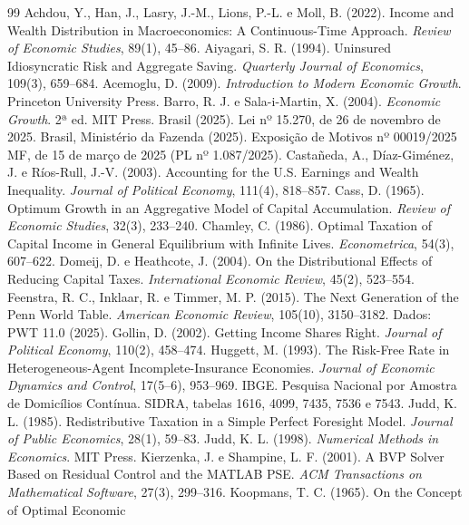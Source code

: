 \documentclass[11pt,a4paper]{article}
\begin{document}
\begin{thebibliography}{99}
\small
{} Achdou, Y., Han, J., Lasry, J.-M., Lions, P.-L. e Moll, B. (2022).
Income and Wealth Distribution in Macroeconomics: A Continuous-Time Approach.
\emph{Review of Economic Studies}, 89(1), 45--86.
 Aiyagari, S. R. (1994). Uninsured Idiosyncratic Risk and
Aggregate Saving. \emph{Quarterly Journal of Economics}, 109(3), 659--684.
 Acemoglu, D. (2009). \emph{Introduction to Modern Economic
Growth}. Princeton University Press.
 Barro, R. J. e Sala-i-Martin, X. (2004). \emph{Economic Growth}.
2ª ed. MIT Press.
 Brasil (2025). Lei nº 15.270, de 26 de novembro de 2025.
 Brasil, Ministério da Fazenda (2025). Exposição de Motivos
nº 00019/2025 MF, de 15 de março de 2025 (PL nº 1.087/2025).
 Castañeda, A., Díaz-Giménez, J. e Ríos-Rull, J.-V. (2003).
Accounting for the U.S. Earnings and Wealth Inequality. \emph{Journal of
Political Economy}, 111(4), 818--857.
 Cass, D. (1965). Optimum Growth in an Aggregative Model of Capital
Accumulation. \emph{Review of Economic Studies}, 32(3), 233--240.
 Chamley, C. (1986). Optimal Taxation of Capital Income in
General Equilibrium with Infinite Lives. \emph{Econometrica}, 54(3), 607--622.
 Domeij, D. e Heathcote, J. (2004). On the Distributional
Effects of Reducing Capital Taxes. \emph{International Economic Review}, 45(2),
523--554.
 Feenstra, R. C., Inklaar, R. e Timmer, M. P. (2015). The Next
Generation of the Penn World Table. \emph{American Economic Review}, 105(10),
3150--3182. Dados: PWT 11.0 (2025).
 Gollin, D. (2002). Getting Income Shares Right.
\emph{Journal of Political Economy}, 110(2), 458--474.
 Huggett, M. (1993). The Risk-Free Rate in
Heterogeneous-Agent Incomplete-Insurance Economies. \emph{Journal of Economic
Dynamics and Control}, 17(5--6), 953--969.
 IBGE. Pesquisa Nacional por Amostra de Domicílios Contínua.
SIDRA, tabelas 1616, 4099, 7435, 7536 e 7543.
 Judd, K. L. (1985). Redistributive Taxation in a Simple
Perfect Foresight Model. \emph{Journal of Public Economics}, 28(1), 59--83.
 Judd, K. L. (1998). \emph{Numerical Methods in Economics}.
MIT Press.
 Kierzenka, J. e Shampine, L. F. (2001). A BVP Solver Based
on Residual Control and the MATLAB PSE. \emph{ACM Transactions on Mathematical
Software}, 27(3), 299--316.
 Koopmans, T. C. (1965). On the Concept of Optimal Economic

\end{thebibliography}
\end{document}
